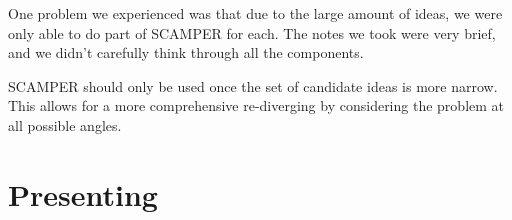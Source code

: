\documentclass{beamer}
\begin{document}
{\begin{example}
\begin{center}
        \end{center}
    \end{example}
    One problem we experienced was that due to the large amount of ideas, we were only able to do part of SCAMPER for each. The notes we took were very brief, and we didn't carefully think through all the components.
    \begin{takeaway}
        SCAMPER should only be used once the set of candidate ideas is more narrow. This allows for a more comprehensive re-diverging by considering the problem at all possible angles.
    \end{takeaway}
}
\section{Presenting}
\end{document}
